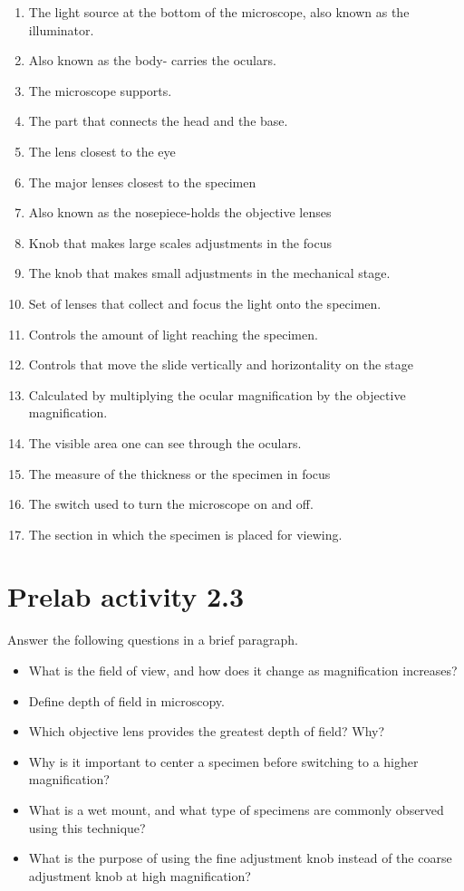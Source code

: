 \documentclass[
  letterpaper,
  DIV=11,
  numbers=noendperiod]{scrreprt}
\begin{document}
\begin{enumerate}
\def\labelenumi{(\alph{enumi})}
\item
  The light source at the bottom of the microscope, also known as the
  illuminator.
\item
  Also known as the body- carries the oculars.
\item
  The microscope supports.
\item
  The part that connects the head and the base.
\item
  The lens closest to the eye
\item
  The major lenses closest to the specimen
\item
  Also known as the nosepiece-holds the objective lenses
\item
  Knob that makes large scales adjustments in the focus
\item
  The knob that makes small adjustments in the mechanical stage.
\item
  Set of lenses that collect and focus the light onto the specimen.
\item
  Controls the amount of light reaching the specimen.
\item
  Controls that move the slide vertically and horizontality on the stage
\item
  Calculated by multiplying the ocular magnification by the objective
  magnification.
\item
  The visible area one can see through the oculars.
\item
  The measure of the thickness or the specimen in focus
\item
  The switch used to turn the microscope on and off.
\item
  The section in which the specimen is placed for viewing.
\end{enumerate}

\section{\texorpdfstring{\textbf{Prelab activity
2.3}}{Prelab activity 2.3}}\label{prelab-activity-2.3}

Answer the following questions in a brief paragraph.

\begin{itemize}
\item
  What is the field of view, and how does it change as magnification
  increases?
\item
  Define depth of field in microscopy.
\item
  Which objective lens provides the greatest depth of field? Why?
\item
  Why is it important to center a specimen before switching to a higher
  magnification?
\item
  What is a wet mount, and what type of specimens are commonly observed
  using this technique?
\item
  What is the purpose of using the fine adjustment knob instead of the
  coarse adjustment knob at high magnification?
\end{itemize}
\end{document}
